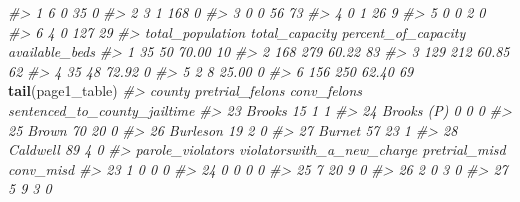 \documentclass[
  12pt,
]{book}
\newenvironment{Shaded}{\begin{snugshade}}{\end{snugshade}}
\newcommand{\CommentTok}[1]{\textcolor[rgb]{0.37,0.37,0.37}{\textit{#1}}}
\newcommand{\KeywordTok}[1]{\textcolor[rgb]{0.27,0.27,0.27}{\textbf{#1}}}
\newcommand{\NormalTok}[1]{#1}
\begin{document}
\begin{Shaded}
\begin{Highlighting}[]
\CommentTok{\#\textgreater{} 1                          6            0          35              0}
\CommentTok{\#\textgreater{} 2                          3            1         168              0}
\CommentTok{\#\textgreater{} 3                          0            0          56             73}
\CommentTok{\#\textgreater{} 4                          0            1          26              9}
\CommentTok{\#\textgreater{} 5                          0            0           2              0}
\CommentTok{\#\textgreater{} 6                          4            0         127             29}
\CommentTok{\#\textgreater{}   total\_population total\_capacity percent\_of\_capacity available\_beds}
\CommentTok{\#\textgreater{} 1               35             50               70.00             10}
\CommentTok{\#\textgreater{} 2              168            279               60.22             83}
\CommentTok{\#\textgreater{} 3              129            212               60.85             62}
\CommentTok{\#\textgreater{} 4               35             48               72.92              0}
\CommentTok{\#\textgreater{} 5                2              8               25.00              0}
\CommentTok{\#\textgreater{} 6              156            250               62.40             69}
\KeywordTok{tail}\NormalTok{(page1\_table)}
\CommentTok{\#\textgreater{}        county pretrial\_felons conv\_felons sentenced\_to\_county\_jailtime}
\CommentTok{\#\textgreater{} 23     Brooks              15           1                            1}
\CommentTok{\#\textgreater{} 24 Brooks (P)               0           0                            0}
\CommentTok{\#\textgreater{} 25      Brown              70          20                            0}
\CommentTok{\#\textgreater{} 26   Burleson              19           2                            0}
\CommentTok{\#\textgreater{} 27     Burnet              57          23                            1}
\CommentTok{\#\textgreater{} 28   Caldwell              89           4                            0}
\CommentTok{\#\textgreater{}    parole\_violators violatorswith\_a\_new\_charge pretrial\_misd conv\_misd}
\CommentTok{\#\textgreater{} 23                1                          0             0         0}
\CommentTok{\#\textgreater{} 24                0                          0             0         0}
\CommentTok{\#\textgreater{} 25                7                         20             9         0}
\CommentTok{\#\textgreater{} 26                2                          0             3         0}
\CommentTok{\#\textgreater{} 27                5                          9             3         0}

\end{Highlighting}
\end{Shaded}
\end{document}
